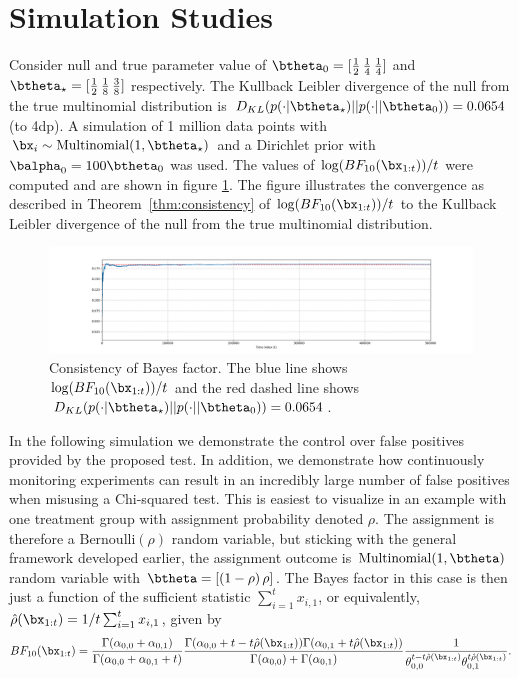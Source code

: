 \documentclass[11pt]{article}
\def\log{{\rm log}}
\begin{document}
\section{Simulation Studies}
\label{sec:simulation}
Consider null and true parameter value of $\btheta_0=[\frac{1}{2}\, \frac{1}{4}\, \frac{1}{4}]$ and $\btheta_\star=[\frac{1}{2}\, \frac{1}{8}\, \frac{3}{8}]$ respectively.
The Kullback Leibler divergence of the null from the true multinomial distribution is $D_{KL}(p(\cdot|\btheta_\star)||p(\cdot||\btheta_0)) = 0.0654$ (to 4dp).
A simulation of 1 million data points with $\bx_i \sim \text{Multinomial}(1, \btheta_\star)$ and a Dirichlet prior with $\balpha_0 = 100\btheta_0$ was used.
The values of $\log(BF_{10}(\bx_{1:t}))/t$ were computed and are shown in figure \ref{fig:lbf}.
The figure illustrates the convergence as described in Theorem~\ref{thm:consistency} of $\log(BF_{10}(\bx_{1:t}))/t$ to the Kullback Leibler divergence of the null from the true multinomial distribution.
\begin{figure}[H]
  \centering
  \includegraphics[scale=0.35]{images/consistency.png}
  \caption{Consistency of Bayes factor.
The blue line shows $\log(BF_{10}(\bx_{1:t}))/t$ and the red dashed line shows $D_{KL}(p(\cdot|\btheta_\star)||p(\cdot||\btheta_0)) = 0.0654$.}
    \label{fig:lbf}
  \end{figure}
  In the following simulation we demonstrate the control over false positives provided by the proposed test.
In addition, we demonstrate how continuously monitoring experiments can result in an incredibly large number of false positives when misusing a Chi-squared test.
This is easiest to visualize in an example with one treatment group with assignment probability denoted $\rho$.
The assignment is therefore a $\text{Bernoulli}(\rho)$ random variable, but sticking with the general framework developed earlier, the assignment outcome is $\text{Multinomial}(1,\btheta)$ random variable with $\btheta = [(1-\rho)\, \rho]$.
The Bayes factor in this case is then just a function of the sufficient statistic $\sum_{i=1}^t x_{i,1}$, or equivalently, $\hat{\rho}(\bx_{1:t}) = 1/t \sum_{i=1}^{t} x_{i,1}$, given by
\begin{equation}
  \label{eq:bayes_factor}
 BF_{10}(\bx_{1:t})  = \frac{\Gamma(\alpha_{0,0}+\alpha_{0,1})}{\Gamma(\alpha_{0,0}+\alpha_{0,1}+t)}\frac{\Gamma(\alpha_{0,0} + t-t\hat{\rho}(\bx_{1:t} ))\Gamma(\alpha_{0,1} + t\hat{\rho}(\bx_{1:t} )) }{\Gamma(\alpha_{0,0} )+\Gamma(\alpha_{0,1} )}\frac{1}{\theta_{0,0}^{t-t\hat{\rho}(\bx_{1:t})}\theta_{0,1}^{t\hat{\rho}(\bx_{1:t})}}.
\end{equation}
\end{document}
